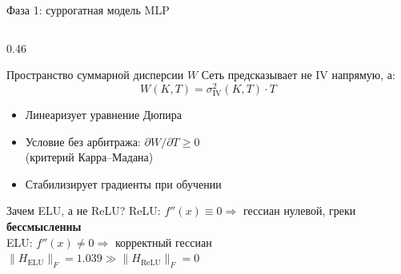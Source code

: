 \documentclass[aspectratio=169, 10pt]{beamer}
\begin{document}
\begin{frame}{Фаза 1: суррогатная модель MLP}
\begin{columns}[T]
    \begin{column}{0.46\textwidth}
      \begin{block}{Пространство суммарной дисперсии $W$}
        \small
        Сеть предсказывает не IV напрямую, а:
        \[ W(K,T) = \sigma_{\mathrm{IV}}^2(K,T)\cdot T \]
        \begin{itemize}
          \item[\faCheck] Линеаризует уравнение Дюпира
          \item[\faCheck] Условие без арбитража:
                $\partial W/\partial T \ge 0$\\
                (критерий Карра--Мадана)
          \item[\faCheck] Стабилизирует градиенты при обучении
        \end{itemize}
      \end{block}
      \vspace{0.25em}
      \begin{alertblock}{Зачем ELU, а не ReLU?}
        \scriptsize
        ReLU: $f''(x) \equiv 0 \Rightarrow$ гессиан нулевой, греки \textbf{бессмысленны}\\[0.2em]
        ELU: $f''(x) \neq 0 \Rightarrow$ корректный гессиан\\[-0.1em]
        $\|H_\mathrm{ELU}\|_F = 1.039 \gg \|H_\mathrm{ReLU}\|_F = 0$
      \end{alertblock}
    \end{column}

  \end{columns}
\end{frame}
\end{document}
